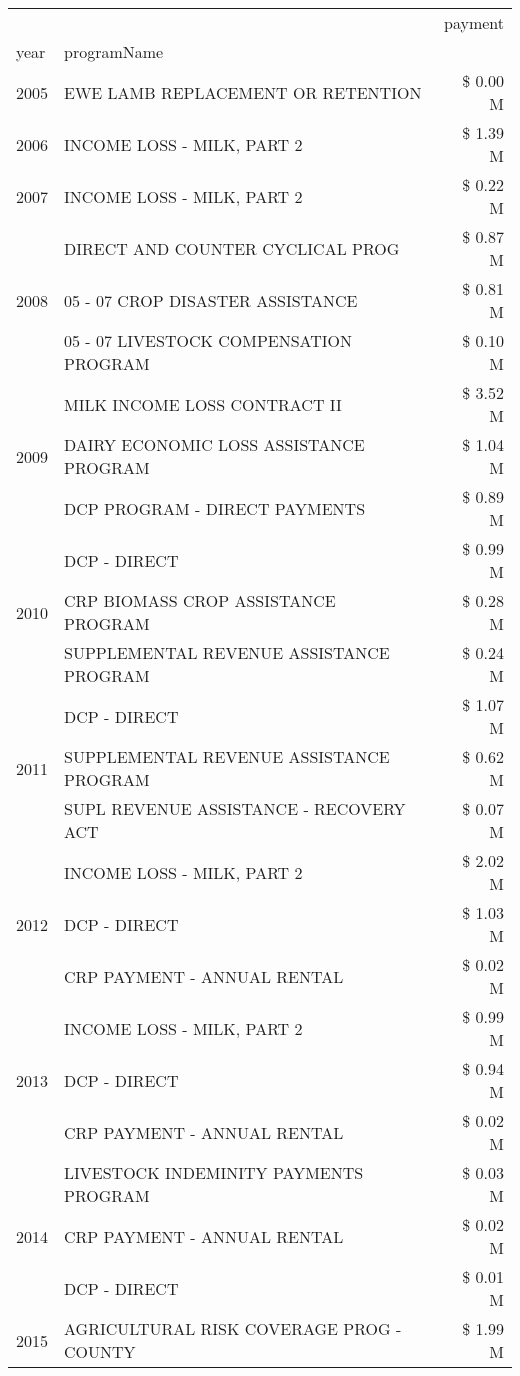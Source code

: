 \begin{tabular}{llr}
\toprule
 &  & payment \\
year & programName &  \\
\midrule
2005 & EWE LAMB REPLACEMENT OR RETENTION & \$ 0.00 M \\
\cline{1-3}
2006 & INCOME LOSS - MILK, PART 2 & \$ 1.39 M \\
\cline{1-3}
2007 & INCOME LOSS - MILK, PART 2 & \$ 0.22 M \\
\cline{1-3}
\multirow[t]{3}{*}{2008} & DIRECT AND COUNTER CYCLICAL PROG & \$ 0.87 M \\
 & 05 - 07 CROP DISASTER ASSISTANCE & \$ 0.81 M \\
 & 05 - 07 LIVESTOCK COMPENSATION PROGRAM & \$ 0.10 M \\
\cline{1-3}
\multirow[t]{3}{*}{2009} & MILK INCOME LOSS CONTRACT II & \$ 3.52 M \\
 & DAIRY ECONOMIC LOSS ASSISTANCE PROGRAM & \$ 1.04 M \\
 & DCP PROGRAM - DIRECT PAYMENTS & \$ 0.89 M \\
\cline{1-3}
\multirow[t]{3}{*}{2010} & DCP - DIRECT & \$ 0.99 M \\
 & CRP BIOMASS CROP ASSISTANCE PROGRAM & \$ 0.28 M \\
 & SUPPLEMENTAL REVENUE ASSISTANCE PROGRAM & \$ 0.24 M \\
\cline{1-3}
\multirow[t]{3}{*}{2011} & DCP - DIRECT & \$ 1.07 M \\
 & SUPPLEMENTAL REVENUE ASSISTANCE PROGRAM & \$ 0.62 M \\
 & SUPL REVENUE ASSISTANCE - RECOVERY ACT & \$ 0.07 M \\
\cline{1-3}
\multirow[t]{3}{*}{2012} & INCOME LOSS - MILK, PART 2 & \$ 2.02 M \\
 & DCP - DIRECT & \$ 1.03 M \\
 & CRP PAYMENT - ANNUAL RENTAL & \$ 0.02 M \\
\cline{1-3}
\multirow[t]{3}{*}{2013} & INCOME LOSS - MILK, PART 2 & \$ 0.99 M \\
 & DCP - DIRECT & \$ 0.94 M \\
 & CRP PAYMENT - ANNUAL RENTAL & \$ 0.02 M \\
\cline{1-3}
\multirow[t]{3}{*}{2014} & LIVESTOCK INDEMINITY PAYMENTS PROGRAM & \$ 0.03 M \\
 & CRP PAYMENT - ANNUAL RENTAL & \$ 0.02 M \\
 & DCP - DIRECT & \$ 0.01 M \\
\cline{1-3}
\multirow[t]{3}{*}{2015} & AGRICULTURAL RISK COVERAGE PROG - COUNTY & \$ 1.99 M \\

\end{tabular}
